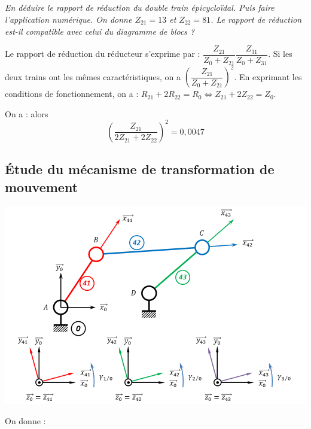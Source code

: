 \documentclass[10pt,fleqn]{article} %
\begin{document}
\begin{multicols}{2}
\subparagraph{}
\textit{En déduire le rapport de réduction du double train épicycloïdal. Puis faire l'application numérique. On donne $Z_{21}=13$ et $Z_{22}=81$. Le rapport de réduction est-il compatible avec celui du diagramme de blocs ?}

\ifprof
\begin{corrige}

Le rapport de réduction du réducteur s'exprime par : 
$\dfrac{Z_{21}}{Z_{0}+Z_{21}}\dfrac{Z_{31}}{Z_{0}+Z_{31}}$. Si les deux trains ont les mêmes caractéristiques, on a $\left(\dfrac{Z_{21}}{Z_{0}+Z_{21}}\right)^2$. 
En exprimant les conditions de fonctionnement, on a : 
$R_{21}+2R_{22}=R_0\Leftrightarrow Z_{21}+2Z_{22}=Z_0$. %

On a : alors 
$$
\left(\dfrac{Z_{21}}{2 Z_{21}+2Z_{22}}\right)^2=0,0047%
$$
\end{corrige}
\else \fi

\subsection*{Étude du mécanisme de transformation de mouvement}

\ifprof
\else

\begin{center}
\includegraphics[width=\linewidth]{images/A6_3barres}
\end{center}

On donne : 


\end{multicols}
\end{document}
